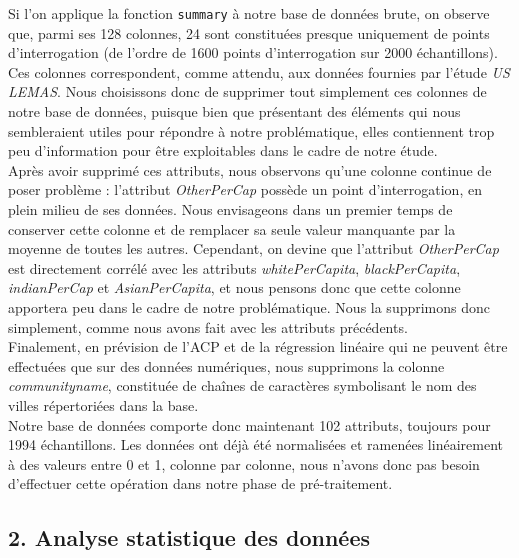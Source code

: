\documentclass[a4paper,12pt]{article}
\begin{document}
Si l'on applique la fonction \texttt{summary} à notre base de données brute, on observe que, parmi ses 128 colonnes, 24 sont constituées presque uniquement de points d'interrogation (de l'ordre de 1600 points d'interrogation sur 2000 échantillons). Ces colonnes correspondent, comme attendu, aux données fournies par l'étude \emph{US LEMAS}. Nous choisissons donc de supprimer tout simplement ces colonnes de notre base de données, puisque bien que présentant des éléments qui nous sembleraient utiles pour répondre à notre problématique, elles contiennent trop peu d'information pour être exploitables dans le cadre de notre étude.
\ \\

Après avoir supprimé ces attributs, nous observons qu'une colonne continue de poser problème : l'attribut \emph{OtherPerCap} possède un point d'interrogation, en plein milieu de ses données. Nous envisageons dans un premier temps de conserver cette colonne et de remplacer sa seule valeur manquante par la moyenne de toutes les autres. Cependant, on devine que l'attribut \emph{OtherPerCap} est directement corrélé avec les attributs \emph{whitePerCapita}, \emph{blackPerCapita}, \emph{indianPerCap} et \emph{AsianPerCapita}, et nous pensons donc que cette colonne apportera peu dans le cadre de notre problématique. Nous la supprimons donc simplement, comme nous avons fait avec les attributs précédents.
\ \\

Finalement, en prévision de l'ACP et de la régression linéaire qui ne peuvent être effectuées que sur des données numériques, nous supprimons la colonne \emph{communityname}, constituée de chaînes de caractères symbolisant le nom des villes répertoriées dans la base.
\ \\

Notre base de données comporte donc maintenant 102 attributs, toujours pour 1994 échantillons. Les données ont déjà été normalisées et ramenées linéairement à des valeurs entre 0 et 1, colonne par colonne, nous n'avons donc pas besoin d'effectuer cette opération dans notre phase de pré-traitement.

\subsection*{2. Analyse statistique des données}

 
\end{document}
